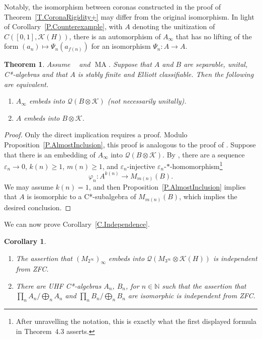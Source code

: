 \documentclass[11pt]{amsproc}
\newcommand{\bbN}{\mathbb N}
\newcommand{\cstar}{C*}
\newcommand{\cQ}{\mathcal Q}
\newcommand{\cK}{\mathcal K}
\DeclareMathOperator{\OCAT}{OCA_T}
\DeclareMathOperator{\MA}{MA}
\theoremstyle{definition}
\theoremstyle{plain}
\newtheorem{theorem}[definition]{Theorem}
\newtheorem{corollary}[definition]{Corollary}
\theoremstyle{remark}
\begin{document}
Notably, the isomorphism between coronas constructed in the proof of Theorem~\ref{T.CoronaRigidity+} may differ from the original isomorphism. In light of Corollary~\ref{P.Counterexample}, with $A$ denoting the unitization of $C([0,1],\cK(H))$, there is an automorphism of $A_\infty$ that has no 
lifting of the form $(a_n)\mapsto \Psi_n(a_{f(n)})$ for an isomorphism $\Psi_n\colon A\to A$. 



\begin{theorem}\label{T.CoronaEmbedding+} Assume $\OCAT$ and $\MA$. 
	Suppose that $A$ and $B$ are separable, unital, \cstar-algebras and that $A$ is stably finite and Elliott classifiable. Then the following are equivalent. 
	\begin{enumerate}
		\item $A_\infty$ embeds into $\cQ(B\otimes \cK)$ (not necessarily unitally). 
		\item $A$ embeds into $B\otimes \cK$. 
	\end{enumerate}
\end{theorem}

\begin{proof} 
Only the direct implication requires a proof. Modulo Proposition~\ref{P.AlmostInclusion}, this proof is analogous to the proof of \cite[Theorem~D]{vignati2022rigidity}. 
Suppose that there is an embedding of $A_\infty$ into $\cQ(B\otimes \cK)$. 
By \cite[Theorem~4.3]{vignati2022rigidity}, there are a sequence $\varepsilon_n\to 0$, $k(n)\geq 1$, $m(n)\geq 1$,  and $\varepsilon_n$-injective $\varepsilon_n$-$*$-homomorphism\footnote{After unravelling the notation, this is exactly what the first displayed formula in Theorem~4.3 asserts.}
\[
\varphi_n\colon A^{k(n)}\to M_{m(n)}(B). 
\]
We may assume $k(n)=1$, and then Proposition~\ref{P.AlmostInclusion} implies that $A$ is isomorphic to a \cstar-subalgebra of $M_{m(n)}(B)$, which implies the desired conclusion. 
\end{proof}

We can now prove Corollary~\ref{C.Independence}. 

\begin{corollary}\label{C.Independence.+}
	\begin{enumerate}
		\item The assertion that $(M_{2^\infty})_\infty$ embeds into $\cQ(M_{3^\infty}\otimes \cK(H))$ is independent from ZFC. 
		\item 	There are UHF \cstar-algebras $A_n$, $B_n$, for $n\in \bbN$ such that the assertion that $\prod_n A_n/\bigoplus_n A_n$ and $\prod_n B_n/\bigoplus_n B_n$ are isomorphic is independent from ZFC. 
	\end{enumerate}
\end{corollary}
\end{document}
